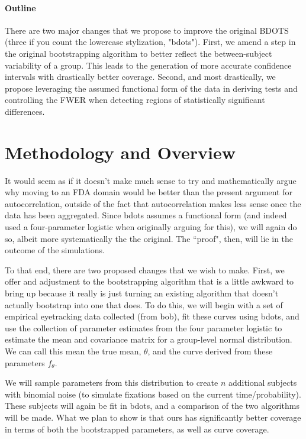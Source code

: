 \documentclass{article}
\begin{document}
\paragraph{Outline} There are two major changes that we propose to improve the original BDOTS (three if you count the lowercase stylization, "bdots"). First, we amend a step in the original bootstrapping algorithm to better reflect the between-subject variability of a group. This leads to the generation of more accurate confidence intervals with drastically better coverage. Second, and most drastically, we propose leveraging the assumed functional form of the data in deriving tests and controlling the FWER when detecting regions of statistically significant differences.

\section{Methodology and Overview} 

It would seem as if it doesn't make much sense to try and mathematically argue why moving to an FDA domain would be better than the present argument for autocorrelation, outside of the fact that autocorrelation makes less sense once the data has been aggregated. Since bdots assumes a functional form (and indeed used a four-parameter logistic when originally arguing for this), we will again do so, albeit more systematically the the original. The ``proof", then, will lie in the outcome of the simulations.

To that end, there are two proposed changes that we wish to make. First, we offer and adjustment to the bootstrapping algorithm that is a little awkward to bring up because it really is just turning an existing algorithm that doesn't actually bootstrap into one that does. To do this, we will begin with a set of empirical eyetracking data collected (from bob), fit these curves using bdots, and use the collection of parameter estimates from the four parameter logistic to estimate the mean and covariance matrix for a group-level normal distribution. We can call this mean the true mean, $\theta$, and the curve derived from these parameters $f_{\theta}$.

We will sample parameters from this distribution to create $n$ additional subjects with binomial noise (to simulate fixations based on the current time/probability). These subjects will again be fit in bdots, and a comparison of the two algorithms will be made. What we plan to show is that ours has significantly better coverage in terms of both the bootstrapped parameters, as well as curve coverage.
\end{document}

